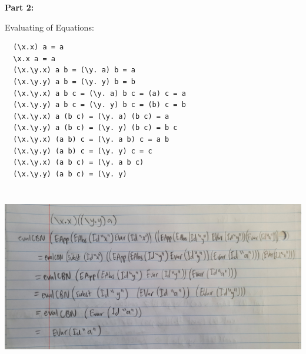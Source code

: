 \documentclass{article}
\theoremstyle{theorem}
\theoremstyle{definition}
\theoremstyle{remark}
\begin{document}
\textbf{Part 2:}

Evaluating of Equations:
\begin{lstlisting}
  (\x.x) a = a         
  \x.x a = a           
  (\x.\y.x) a b = (\y. a) b = a    
  (\x.\y.y) a b = (\y. y) b = b   
  (\x.\y.x) a b c = (\y. a) b c = (a) c = a 
  (\x.\y.y) a b c = (\y. y) b c = (b) c = b 
  (\x.\y.x) a (b c) = (\y. a) (b c) = a
  (\x.\y.y) a (b c) = (\y. y) (b c) = b c 
  (\x.\y.x) (a b) c = (\y. a b) c = a b 
  (\x.\y.y) (a b) c = (\y. y) c = c
  (\x.\y.x) (a b c) = (\y. a b c)
  (\x.\y.y) (a b c) = (\y. y)
\end{lstlisting}

\includegraphics[width=15cm, height=8cm]{Report Images/week5_9.jpg}
\end{document}
